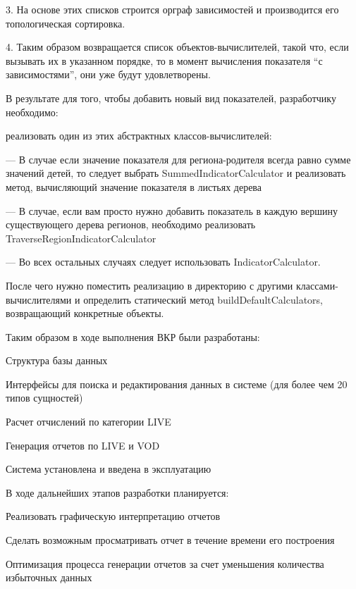 \documentclass[a4paper]{article}
\begin{document}
3. На основе этих списков строится орграф зависимостей и производится его топологическая сортировка.

4. Таким образом возвращается список объектов-вычислителей, такой что, если вызывать их в указанном порядке, то в момент вычисления показателя “с зависимостями”, они уже будут удовлетворены.

\newpage

В результате для того, чтобы добавить новый вид показателей, разработчику необходимо:

реализовать один из этих абстрактных классов-вычислителей:

--- В случае если значение показателя для региона-родителя всегда равно сумме значений детей, то следует выбрать SummedIndicatorCalculator и реализовать метод, вычисляющий значение показателя в листьях дерева

--- В случае, если вам просто нужно добавить показатель в каждую вершину существующего дерева регионов, необходимо реализовать TraverseRegionIndicatorCalculator

--- Во всех остальных случаях следует использовать IndicatorCalculator.

После чего нужно поместить реализацию в директорию с другими классами-вычислителями
и определить статический метод buildDefaultCalculators, возвращающий конкретные объекты.

\newpage

Таким образом в ходе выполнения ВКР были разработаны:

Структура базы данных 

Интерфейсы для поиска и редактирования данных в системе (для более чем 20 типов сущностей)

Расчет отчислений по категории LIVE

Генерация отчетов по LIVE и VOD

Система установлена и введена в эксплуатацию

\newpage
В ходе дальнейших этапов разработки планируется:

Реализовать графическую интерпретацию отчетов

Сделать возможным просматривать отчет в течение времени его построения

Оптимизация процесса генерации отчетов за счет уменьшения количества избыточных данных
\end{document}

